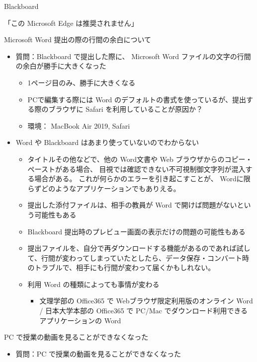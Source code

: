 \documentclass[a4j,10pt]{jsarticle}
\begin{document}
{\begin{frame}[label={sec:org166405d},fragile]{Blackboard}
\begin{block}{「この Microsoft Edge は推奨されません」}
\end{block}
\par
\begin{block}{Microsoft Word 提出の際の行間の余白について}
\begin{itemize}
\item 質問：Blackboard で提出した際に、 Microsoft Word ファイルの文字の行間の余白が勝手に大きくなった
\begin{itemize}
\item 1ページ目のみ、勝手に大きくなる
\item PCで編集する際には Word のデフォルトの書式を使っているが、提出する際のブラウザに Safari を利用していることが原因か？
\item 環境： MacBook Air 2019,  Safari
\end{itemize}
\par
\item Word や Blackboard はあまり使っていないのでわからない
\begin{itemize}
\item タイトルその他などで、他の Word文書や Web ブラウザからのコピー・ペーストがある場合、
目視では確認できない不可視制御文字列が混入する場合がある。
これが何らかのエラーを引き起こすことが、 Wordに限らずどのようなアプリケーションでもありえる。
\item 提出した添付ファイルは、相手の教員が Word で開けば問題がないという可能性もある
\item Blackboard 提出時のプレビュー画面の表示だけの問題の可能性もある
\item 提出ファイルを、自分で再ダウンロードする機能があるのであれば試して、行間が変わってしまっていたとしたら、データ保存・コンバート時のトラブルで、相手にも行間が変わって届くかもしれない。
\item 利用 Word の種類によっても事情が変わる
\begin{itemize}
\item 文理学部の Office365 で Webブラウザ限定利用版のオンライン Word / 日本大学本部の Office365 で PC/Mac でダウンロード利用できるアプリケーションの Word
\end{itemize}
\end{itemize}
\end{itemize}
\end{block}
\par
\begin{block}{PC で授業の動画を見ることができなくなった}
\begin{itemize}
\item 質問：PC で授業の動画を見ることができなくなった

\end{itemize}
\end{block}
\end{frame}}
\end{document}
